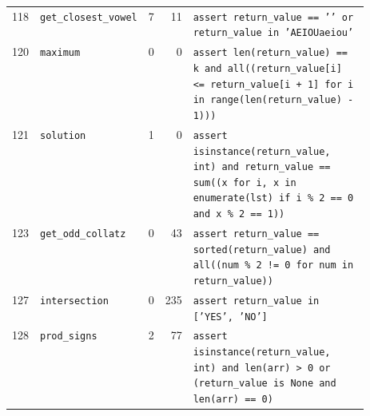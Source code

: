 \begin{footnotesize}
\begin{longtable}{@{}r l r r p{0.52\linewidth}@{}}
118 & \texttt{get\_closest\_vowel} & 7 & 11 & \texttt{assert \allowbreak{}return\_value \allowbreak{}=\allowbreak{}=\allowbreak{} \allowbreak{}'\allowbreak{}'\allowbreak{} \allowbreak{}or \allowbreak{}return\_value \allowbreak{}in \allowbreak{}'\allowbreak{}AEIOUaeiou'\allowbreak{}} \\
120 & \texttt{maximum} & 0 & 0 & \texttt{assert \allowbreak{}len(\allowbreak{}return\_value)\allowbreak{} \allowbreak{}=\allowbreak{}=\allowbreak{} \allowbreak{}k \allowbreak{}and \allowbreak{}all(\allowbreak{}(\allowbreak{}return\_value[\allowbreak{}i]\allowbreak{} \allowbreak{}<\allowbreak{}=\allowbreak{} \allowbreak{}return\_value[\allowbreak{}i \allowbreak{}+\allowbreak{} \allowbreak{}1]\allowbreak{} \allowbreak{}for \allowbreak{}i \allowbreak{}in \allowbreak{}range(\allowbreak{}len(\allowbreak{}return\_value)\allowbreak{} \allowbreak{}-\allowbreak{} \allowbreak{}1)\allowbreak{})\allowbreak{})\allowbreak{}} \\
121 & \texttt{solution} & 1 & 0 & \texttt{assert \allowbreak{}isinstance(\allowbreak{}return\_value,\allowbreak{} \allowbreak{}int)\allowbreak{} \allowbreak{}and \allowbreak{}return\_value \allowbreak{}=\allowbreak{}=\allowbreak{} \allowbreak{}sum(\allowbreak{}(\allowbreak{}x \allowbreak{}for \allowbreak{}i,\allowbreak{} \allowbreak{}x \allowbreak{}in \allowbreak{}enumerate(\allowbreak{}lst)\allowbreak{} \allowbreak{}if \allowbreak{}i \allowbreak{}\% \allowbreak{}2 \allowbreak{}=\allowbreak{}=\allowbreak{} \allowbreak{}0 \allowbreak{}and \allowbreak{}x \allowbreak{}\% \allowbreak{}2 \allowbreak{}=\allowbreak{}=\allowbreak{} \allowbreak{}1)\allowbreak{})\allowbreak{}} \\
123 & \texttt{get\_odd\_collatz} & 0 & 43 & \texttt{assert \allowbreak{}return\_value \allowbreak{}=\allowbreak{}=\allowbreak{} \allowbreak{}sorted(\allowbreak{}return\_value)\allowbreak{} \allowbreak{}and \allowbreak{}all(\allowbreak{}(\allowbreak{}num \allowbreak{}\% \allowbreak{}2 \allowbreak{}!=\allowbreak{} \allowbreak{}0 \allowbreak{}for \allowbreak{}num \allowbreak{}in \allowbreak{}return\_value)\allowbreak{})\allowbreak{}} \\
127 & \texttt{intersection} & 0 & 235 & \texttt{assert \allowbreak{}return\_value \allowbreak{}in \allowbreak{}[\allowbreak{}'\allowbreak{}YES'\allowbreak{},\allowbreak{} \allowbreak{}'\allowbreak{}NO'\allowbreak{}]\allowbreak{}} \\
128 & \texttt{prod\_signs} & 2 & 77 & \texttt{assert \allowbreak{}isinstance(\allowbreak{}return\_value,\allowbreak{} \allowbreak{}int)\allowbreak{} \allowbreak{}and \allowbreak{}len(\allowbreak{}arr)\allowbreak{} \allowbreak{}>\allowbreak{} \allowbreak{}0 \allowbreak{}or \allowbreak{}(\allowbreak{}return\_value \allowbreak{}is \allowbreak{}None \allowbreak{}and \allowbreak{}len(\allowbreak{}arr)\allowbreak{} \allowbreak{}=\allowbreak{}=\allowbreak{} \allowbreak{}0)\allowbreak{}} \\

\end{longtable}
\end{footnotesize}
